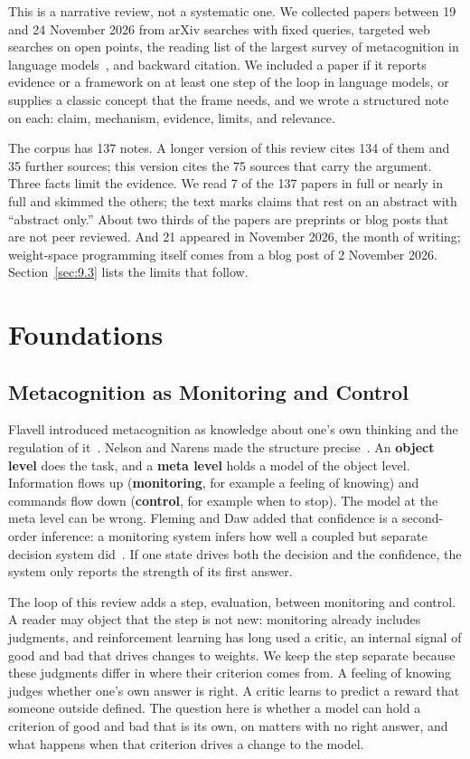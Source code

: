 \documentclass[journal]{IEEEtran}
\begin{document}
This is a narrative review, not a systematic one. We collected papers between 19 and 24 November 2026 from arXiv searches with fixed queries, targeted web searches on open points, the reading list of the largest survey of metacognition in language models~\cite{Liu2026}, and backward citation. We included a paper if it reports evidence or a framework on at least one step of the loop in language models, or supplies a classic concept that the frame needs, and we wrote a structured note on each: claim, mechanism, evidence, limits, and relevance.

The corpus has 137 notes. A longer version of this review cites 134 of them and 35 further sources; this version cites the 75 sources that carry the argument. Three facts limit the evidence. We read 7 of the 137 papers in full or nearly in full and skimmed the others; the text marks claims that rest on an abstract with ``abstract only.'' About two thirds of the papers are preprints or blog posts that are not peer reviewed. And 21 appeared in November 2026, the month of writing; weight-space programming itself comes from a blog post of 2 November 2026. Section~\ref{sec:9.3} lists the limits that follow.

\section{Foundations}\label{sec:2}

\subsection{Metacognition as Monitoring and Control}\label{sec:2.1}

Flavell introduced metacognition as knowledge about one's own thinking and the regulation of it~\cite{Flavell1979}. Nelson and Narens made the structure precise~\cite{Nelson1990}. An \textbf{object level} does the task, and a \textbf{meta level} holds a model of the object level. Information flows up (\textbf{monitoring}, for example a feeling of knowing) and commands flow down (\textbf{control}, for example when to stop). The model at the meta level can be wrong. Fleming and Daw added that confidence is a second-order inference: a monitoring system infers how well a coupled but separate decision system did~\cite{Fleming2017}. If one state drives both the decision and the confidence, the system only reports the strength of its first answer.

The loop of this review adds a step, evaluation, between monitoring and control. A reader may object that the step is not new: monitoring already includes judgments, and reinforcement learning has long used a critic, an internal signal of good and bad that drives changes to weights. We keep the step separate because these judgments differ in where their criterion comes from. A feeling of knowing judges whether one's own answer is right. A critic learns to predict a reward that someone outside defined. The question here is whether a model can hold a criterion of good and bad that is its own, on matters with no right answer, and what happens when that criterion drives a change to the model.
\end{document}
